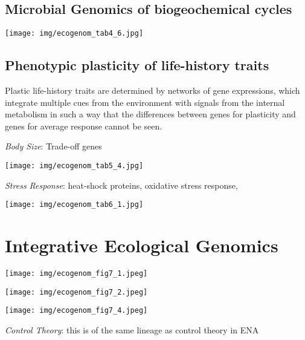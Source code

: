 \documentclass[9pt,twocolumn,twoside]{pnas-new}
\begin{document}
\subsection{Microbial Genomics of biogeochemical cycles}

\texttt{[image: img/ecogenom\_tab4\_6.jpg]}

\subsection{Phenotypic plasticity of life-history traits}

Plastic life-history traits are determined by networks of gene expressions, which integrate multiple cues from the environment with signals from the internal metabolism in such a way that the differences between genes for plasticity and genes for average response cannot be seen.

\textit{Body Size}: Trade-off genes

\texttt{[image: img/ecogenom\_tab5\_4.jpg]}

\textit{Stress Response}: heat-shock proteins, oxidative stress response, 

\texttt{[image: img/ecogenom\_tab6\_1.jpg]}

\section{Integrative Ecological Genomics}

\texttt{[image: img/ecogenom\_fig7\_1.jpeg]}

\texttt{[image: img/ecogenom\_fig7\_2.jpeg]}

\texttt{[image: img/ecogenom\_fig7\_4.jpeg]}

\textit{Control Theory}: this is of the same lineage as control theory in ENA


\end{document}
